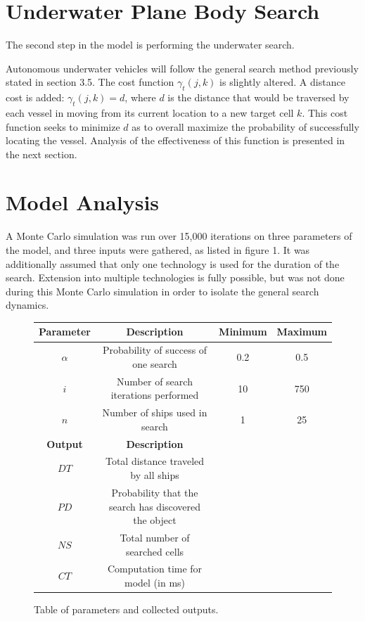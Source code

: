 \documentclass[a4paper]{article}
\begin{document}
\section{Underwater Plane Body Search}
The second step in the model is performing the underwater search. 

Autonomous underwater vehicles will follow the general search method previously stated in section 3.5. The cost function $\gamma_t(j,k)$ is slightly altered. A distance cost is added: $\gamma_t(j,k)=d$, where $d$ is the distance that would be traversed by each vessel in moving from its current location to a new target cell $k$. This cost function seeks to minimize $d$ as to overall maximize the probability of successfully locating the vessel. Analysis of the effectiveness of this function is presented in the next section.

\section{Model Analysis}

A Monte Carlo simulation was run over 15,000 iterations on three parameters of the model, and three inputs were gathered, as listed in figure 1. It was additionally assumed that only one technology is used for the duration of the search. Extension into multiple technologies is fully possible, but was not done during this Monte Carlo simulation in order to isolate the general search dynamics.

\begin{figure}[H]\begin{center}\begin{tabular}{|c|c|c|c|}
\hline \textbf{Parameter} & \textbf{Description} & \textbf{Minimum} & \textbf{Maximum}\\\hline\hline
$\alpha$ & Probability of success of one search & 0.2 & 0.5 \\\hline
$i$ & Number of search iterations performed & 10 & 750 \\\hline
$n$ & Number of ships used in search & 1 & 25 \\\hline\hline
\textbf{Output} & \textbf{Description} &&\\\hline
$DT$ & Total distance traveled by all ships &&\\\hline
$PD$ & Probability that the search has discovered the object &&\\\hline
$NS$ & Total number of searched cells &&\\\hline
$CT$ & Computation time for model (in ms) &&\\\hline
\end{tabular}\end{center}
\caption{Table of parameters and collected outputs.}
\end{figure}
\end{document}
